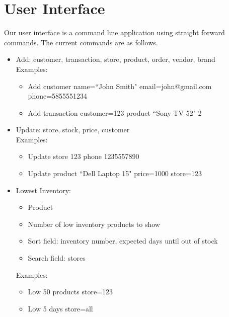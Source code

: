 \documentclass{article}
\begin{document}
	\section{User Interface}
    Our user interface is a command line application using straight forward
    commands. The current commands are as follows.

    \begin{itemize}
      \item
        Add: customer, transaction, store, product, order, vendor, brand\\
        Examples:
        \begin{itemize}
          \item Add customer name=``John Smith" email=john@gmail.com phone=5855551234
          \item Add transaction customer=123 product ``Sony TV 52" 2
        \end{itemize}

      \item
        Update: store, stock, price, customer\\
        Examples:
        \begin{itemize}
          \item Update store 123 phone 1235557890
          \item Update product ``Dell Laptop 15" price=1000 store=123
        \end{itemize}

        \pagebreak

      \item 
        Lowest Inventory:
        \begin{itemize}
          \item Product
          \item Number of low inventory products to show
          \item Sort field: inventory number, expected days until out of stock
          \item Search field: stores
        \end{itemize}
        Examples:
        \begin{itemize}
          \item Low 50 products store=123
          \item Low 5 days store=all
        \end{itemize}


\end{itemize}
\end{document}
